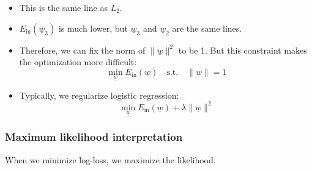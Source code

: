 \begin{example}
        \begin{itemize}
            \item This is the same line as \(L_2\).
            \item \(E_{\text{in}}(\underline{w}_3)\) is much lower, but \(\underline{w}_3\) and \(\underline{w}_2\) are the same lines.
            \item Therefore, we can fix the norm of \(\|\underline{w}\|^2\) to be 1. But this constraint makes the optimization more difficult:
            \[
            \min_{\underline{w}} E_{\text{in}}(\underline{w}) \quad \text{s.t.} \quad \|\underline{w}\| = 1
            \]
            \item Typically, we regularize logistic regression:
            \[
            \min_{\underline{w}} E_{\text{in}}(\underline{w}) + \lambda \|\underline{w}\|^2
            \]
        \end{itemize}

    \end{example}

    \subsubsection{Maximum likelihood interpretation}
    \begin{definition}
        When we minimize log-loss, we maximize the likelihood.
    \end{definition}

